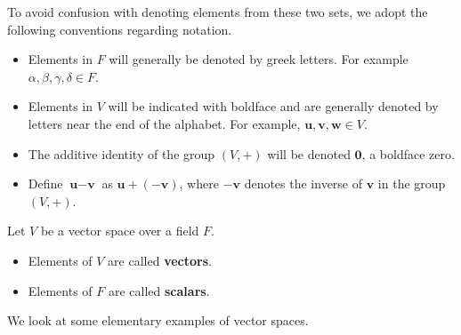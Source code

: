 To avoid confusion with denoting elements from these two sets, we adopt the following conventions regarding notation.
\begin{itemize}
    \item Elements in $F$ will generally be denoted by greek letters. For example $\alpha, \beta, \gamma, \delta \in F$.
    \item Elements in $V$ will be indicated with boldface and are generally denoted by letters near the end of the alphabet. For example, $\textbf{u}, \textbf{v}, \textbf{w} \in V$.
    \item The additive identity of the group $(V, +)$ will be denoted $\textbf{0}$, a boldface zero.
    \item Define $\textbf{u} - \textbf{v}$ as $\textbf{u} + (-\textbf{v})$, where $-\textbf{v}$ denotes the inverse of $\textbf{v}$ in the group $(V, +)$.
\end{itemize}

\begin{definition}
    Let $V$ be a vector space over a field $F$.
    \begin{itemize}
        \item Elements of $V$ are called \textbf{vectors}.
        \item Elements of $F$ are called \textbf{scalars}.
    \end{itemize}
\end{definition}

We look at some elementary examples of vector spaces.

